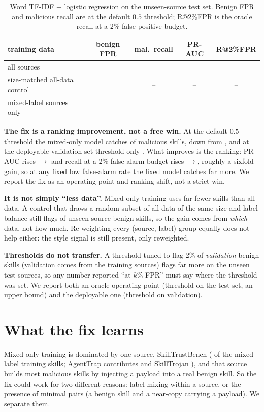 \begin{table}[t]
\caption{Word TF-IDF + logistic regression on the unseen-source test set. Benign FPR and malicious
recall are at the default $0.5$ threshold; R@2\%FPR is the oracle recall at a 2\% false-positive budget.}
\label{tab:fix}
\centering
\begin{tabular}{lcccc}
\toprule
training data & benign FPR & mal.\ recall & PR-AUC & R@2\%FPR \\
\midrule
all sources & \FprAll{} & \RecallAll{} & \PrAll{} & \RecallAtTwoAll{} \\
size-matched all-data control & \FprSizeMatched{} & -- & -- & -- \\
mixed-label sources only & \FprMixed{} & \RecallMixed{} & \PrMixed{} & \RecallAtTwoMixed{} \\
\bottomrule
\end{tabular}
\end{table}

\textbf{The fix is a ranking improvement, not a free win.} At the default $0.5$ threshold the mixed-only
model catches \RecallMixed{} of malicious skills, down from \RecallAll{}, and at the deployable
validation-set threshold only \RecallMixedDeploy{}. What improves is the ranking: PR-AUC rises
\PrAll{}$\to$\PrMixed{} and recall at a 2\% false-alarm budget rises \RecallAtTwoAll{}$\to$\RecallAtTwoMixed{}, roughly a sixfold
gain, so at any fixed low false-alarm rate the fixed model catches far more. We report the fix as an operating-point
and ranking shift, not a strict win.

\textbf{It is not simply ``less data''.} Mixed-only training uses far fewer skills than all-data. A
control that draws a random subset of all-data of the same size and label balance still flags
\FprSizeMatched{} of unseen-source benign skills, so the gain comes from \emph{which} data, not how
much. Re-weighting every (source, label) group equally does not help either: the style signal is
still present, only reweighted.

\textbf{Thresholds do not transfer.} A threshold tuned to flag 2\% of \emph{validation} benign skills
(validation comes from the training sources) flags far more on the unseen test sources, so any number
reported ``at $k\%$ FPR'' must say where the threshold was set. We report both an oracle operating
point (threshold on the test set, an upper bound) and the deployable one (threshold on validation).

\section{What the fix learns}
\label{sec:mechanism}
Mixed-only training is dominated by one source, SkillTrustBench (\MixedSkillTrustBench{} of the
mixed-label training skills; AgentTrap contributes \MixedAgentTrap{} and SkillTrojan
\MixedSkillTrojan{}), and that source builds most malicious skills by injecting a payload into a real
benign skill. So the fix could work for two different reasons: label mixing within a source, or the
presence of minimal pairs (a benign skill and a near-copy carrying a payload). We separate them.

